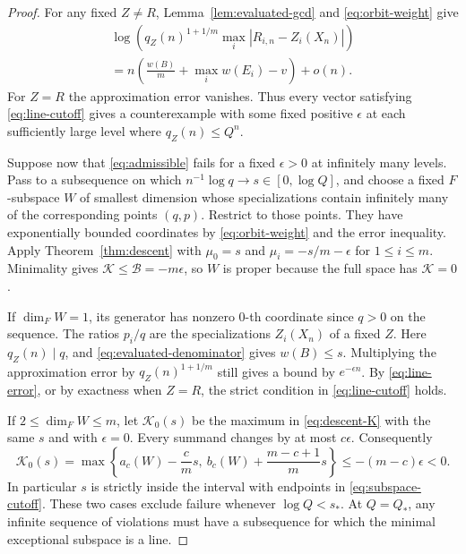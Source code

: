\documentclass[11pt,a4paper,reqno]{amsart}
\theoremstyle{definition}
\theoremstyle{remark}
\numberwithin{equation}{section}
\begin{document}
\begin{proof}
For any fixed \(Z\ne R\), Lemma~\ref{lem:evaluated-gcd} and
\eqref{eq:orbit-weight} give
\begin{multline}\label{eq:line-error}
 \log\left(q_Z(n)^{1+1/m}\max_i|R_{i,n}-Z_i(X_n)|\right)\\
   =n\left(\frac{w(B)}m+\max_i w(E_i)-v\right)+o(n).
\end{multline}
For \(Z=R\) the approximation error vanishes. Thus every vector satisfying
\eqref{eq:line-cutoff} gives a counterexample with some fixed
positive \(\epsilon\) at each sufficiently large level where
\(q_Z(n)\le Q^n\).

Suppose now that \eqref{eq:admissible} fails for a fixed
\(\epsilon>0\) at infinitely many levels. Pass to a subsequence
on which \(n^{-1}\log q\to s\in[0,\log Q]\), and choose a fixed
\(F\)-subspace \(W\) of smallest dimension whose specializations
contain infinitely many of the corresponding points \((q,p)\).
Restrict to those points. They have exponentially bounded
coordinates by \eqref{eq:orbit-weight} and the error inequality.
Apply Theorem~\ref{thm:descent} with
\(\mu_0=s\) and \(\mu_i=-s/m-\epsilon\) for \(1\le i\le m\).
Minimality gives \(\mathcal K\le\mathcal B=-m\epsilon\),
so \(W\) is proper because the full space has \(\mathcal K=0\).

If \(\dim_F W=1\), its generator has nonzero \(0\)-th
coordinate since \(q>0\) on the sequence. The ratios \(p_i/q\)
are the specializations \(Z_i(X_n)\) of a fixed \(Z\).
Here \(q_Z(n)\mid q\), and \eqref{eq:evaluated-denominator}
gives \(w(B)\le s\). Multiplying the approximation error
by \(q_Z(n)^{1+1/m}\) still gives a bound by \(e^{-\epsilon n}\).
By \eqref{eq:line-error}, or by exactness when \(Z=R\),
the strict condition in \eqref{eq:line-cutoff} holds.

If \(2\le\dim_F W\le m\), let \(\mathcal K_0(s)\) be the maximum
in \eqref{eq:descent-K} with the same \(s\) and with \(\epsilon=0\).
Every summand changes by at most \(c\epsilon\). Consequently
\begin{equation}\label{eq:subspace-slope}
 \mathcal K_0(s)
   =\max\left\{a_c(W)-\frac{c}{m}s,\
                b_c(W)+\frac{m-c+1}{m}s\right\}
   \le -(m-c)\epsilon <0 .
\end{equation}
In particular \(s\) is strictly inside the interval with
endpoints in \eqref{eq:subspace-cutoff}.
These two cases exclude failure whenever \(\log Q<s_*\).
At \(Q=Q_*\), any infinite sequence of violations must have a
subsequence for which the minimal exceptional subspace is a line.


\end{proof}
\end{document}
